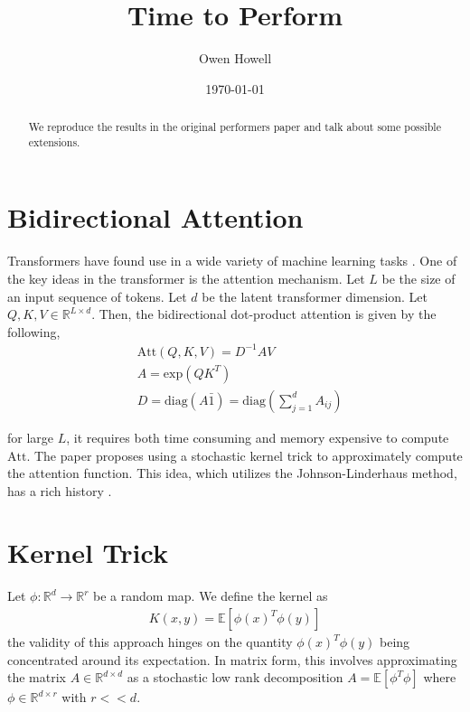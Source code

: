 \documentclass[showpacs,onecolumn,aps,floatfix,superscriptaddress,noshowpacs]{revtex4}
\begin{document}
\title{ Time to Perform }



\author{Owen Howell}
\begin{abstract}
We reproduce the results in the original performers paper and talk about some possible extensions.
\end{abstract}
\date{\today}
\maketitle


\section{Bidirectional Attention}
Transformers have found use in a wide variety of machine learning tasks \cite{Vaswani_2017}. One of the key ideas in the transformer is the attention mechanism. Let $L$ be the size of an input sequence of tokens. Let $d$ be the latent transformer dimension. Let $Q,K,V \in \mathbb{R}^{L\times d}$. Then, the bidirectional dot-product attention is given by the following,
\begin{align*}
&\text{Att}(Q,K,V) = D^{-1} A V \\
& A = \text{exp}(QK^{T}) \\
& D = \text{diag}(A \bar{1} ) = \text{diag}(  \sum_{j=1}^{d} A_{ij}   )
\end{align*}

for large $L$, it requires both time consuming and memory expensive to compute $\text{Att}$. The paper \cite{Choromanski_2020} proposes using a stochastic kernel trick to approximately compute the attention function. This idea, which utilizes the Johnson-Linderhaus method, has a rich history \cite{Choromanski_2017}.


\section{Kernel Trick}
Let $\phi : \mathbb{R}^{d} \rightarrow \mathbb{R}^{r}$ be a random map. We define the kernel as
\begin{align*}
K(x,y) = \mathbb{E}[ \phi(x)^{T} \phi(y)  ] 
\end{align*}
the validity of this approach hinges on the quantity $\phi(x)^{T} \phi(y)$ being concentrated around its expectation. In matrix form, this involves approximating the matrix $A \in \mathbb{R}^{d \times d}$ as a stochastic low rank decomposition $A = \mathbb{E}[\phi^{T} \phi]$ where $\phi \in \mathbb{R}^{d \times r}$ with $r << d$. 
\end{document}
